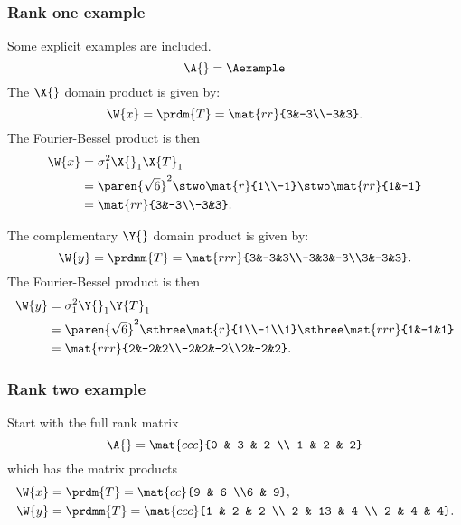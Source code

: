 \subsubsection{Rank one example}
Some explicit examples are included.
\begin{equation}
  \A{}=\Aexample
\end{equation}
The $\X{}$ domain product is given by:
\begin{equation}
  \W{x} = \prdm{T} = \mat{rr}{3&-3\\-3&3}.
\end{equation}
The Fourier-Bessel product is then
\begin{equation}
  \begin{split}
    \W{x} &= \sigma_{1}^{2} \X{}_{1}\X{T}_{1}\\
      &= \paren{\sqrt{6}}^{2} \stwo \mat{r}{1\\-1}\stwo \mat{rr}{1&-1}\\
      &= \mat{rr}{3&-3\\-3&3}.
  \end{split}
\end{equation}

The complementary $\Y{}$ domain product is given by:
\begin{equation}
  \W{y} = \prdmm{T} = \mat{rrr}{3&-3&3\\-3&3&-3\\3&-3&3}.
\end{equation}
The Fourier-Bessel product is then
\begin{equation}
  \begin{split}
    \W{y} &= \sigma_{1}^{2} \Y{}_{1}\Y{T}_{1}\\
      &= \paren{\sqrt{6}}^{2} \sthree \mat{r}{1\\-1\\1} \sthree \mat{rrr}{1&-1&1}\\
      &= \mat{rrr}{2&-2&2\\-2&2&-2\\2&-2&2}.
  \end{split}
\end{equation}

\subsubsection{Rank two example}
Start with the full rank matrix
\begin{equation}
  \A{} = \mat{ccc}{0 & 3 & 2 \\ 1 & 2 & 2}
\end{equation}
which has the matrix products
\begin{equation}
  \begin{split}
    \W{x} &= \prdm{T}  = \mat{cc}{9 & 6 \\6 & 9},\\
    \W{y} &= \prdmm{T} = \mat{ccc}{1 & 2 & 2 \\ 2 & 13 & 4 \\ 2 & 4 & 4}.
  \end{split}
\end{equation}

